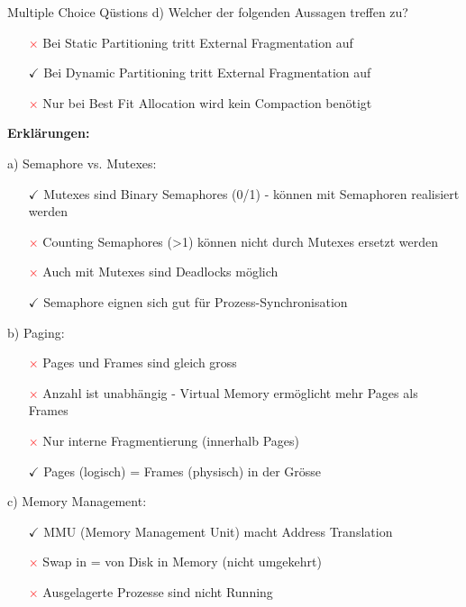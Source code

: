 \begin{example2}{Multiple Choice Qüstions}
    d) Welcher der folgenden Aussagen treffen zu?
    \begin{itemize}
        \item[\textcolor{red}{$\times$}] Bei Static Partitioning tritt External Fragmentation auf
        \item[\textcolor{frog}{$\checkmark$}] Bei Dynamic Partitioning tritt External Fragmentation auf  
        \item[\textcolor{red}{$\times$}] Nur bei Best Fit Allocation wird kein Compaction benötigt
    \end{itemize}
    
    \tcblower
    
    \textbf{Erklärungen:}
    
    a) Semaphore vs. Mutexes:
    \begin{itemize}
        \item[\textcolor{frog}{$\checkmark$}] Mutexes sind Binary Semaphores (0/1) - können mit Semaphoren realisiert werden
        \item[\textcolor{red}{$\times$}] Counting Semaphores (>1) können nicht durch Mutexes ersetzt werden
        \item[\textcolor{red}{$\times$}] Auch mit Mutexes sind Deadlocks möglich
        \item[\textcolor{frog}{$\checkmark$}] Semaphore eignen sich gut für Prozess-Synchronisation
    \end{itemize}
    
    b) Paging:
    \begin{itemize}
        \item[\textcolor{red}{$\times$}] Pages und Frames sind gleich gross
        \item[\textcolor{red}{$\times$}] Anzahl ist unabhängig - Virtual Memory ermöglicht mehr Pages als Frames
        \item[\textcolor{red}{$\times$}] Nur interne Fragmentierung (innerhalb Pages)
        \item[\textcolor{frog}{$\checkmark$}] Pages (logisch) = Frames (physisch) in der Grösse
    \end{itemize}
    
    c) Memory Management:
    \begin{itemize}
        \item[\textcolor{frog}{$\checkmark$}] MMU (Memory Management Unit) macht Address Translation
        \item[\textcolor{red}{$\times$}] Swap in = von Disk in Memory (nicht umgekehrt)
        \item[\textcolor{red}{$\times$}] Ausgelagerte Prozesse sind nicht Running
    \end{itemize}
    

\end{example2}
